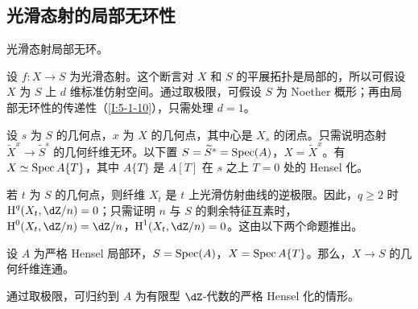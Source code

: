 \subsection{光滑态射的局部无环性}\label{I:5-2}
\begin{theorem}\label{I:5-2-1}
光滑态射局部无环。
\end{theorem}
设 $f:X\to S$ 为光滑态射。这个断言对 $X$ 和 $S$ 的平展拓扑是局部的，所以可假设 $X$ 为 $S$ 上 $d$ 维标准仿射空间。通过取极限，可假设 $S$ 为 Noether 概形；再由局部无环性的传递性（\ref{I:5-1-10}），只需处理 $d=1$。

设 $s$ 为 $S$ 的几何点，$x$ 为 $X$ 的几何点，其中心是 $X_s$ 的闭点。只需说明态射 $\widetilde X^x\to\widetilde S^s$ 的几何纤维无环。以下置 $S=\widetilde S^s=\operatorname{Spec}(A)$，$X=\widetilde X^x$。有 $X\simeq\operatorname{Spec} A\{T\}$，其中 $A\{T\}$ 是 $A[T]$ 在 $s$ 之上 $T=0$ 处的 Hensel 化。

若 $t$ 为 $S$ 的几何点，则纤维 $X_t$ 是 $t$ 上光滑仿射曲线的逆极限。因此，$q\geqslant2$ 时 $\h^q(X_t,\dZ/n)=0$；只需证明 $n$ 与 $S$ 的剩余特征互素时，$\h^0(X_t,\dZ/n)=\dZ/n$，$\h^1(X_t,\dZ/n)=0$。这由以下两个命题推出。
\begin{proposition}\label{I:5-2-2}
设 $A$ 为严格 Hensel 局部环，$S=\operatorname{Spec}(A)$，$X=\operatorname{Spec} A\{T\}$。那么，$X\to S$ 的几何纤维连通。
\end{proposition}
通过取极限，可归约到 $A$ 为有限型 $\dZ$-代数的严格 Hensel 化的情形。

